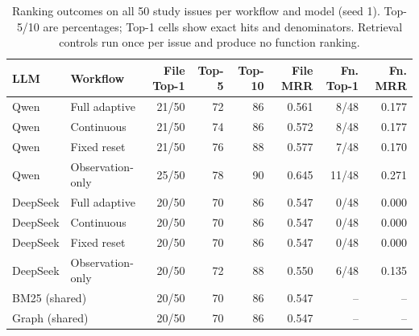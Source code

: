 \begin{table}[t]
\caption{Ranking outcomes on all 50 study issues per workflow and model (seed 1). Top-5/10 are percentages; Top-1 cells show exact hits and denominators. Retrieval controls run once per issue and produce no function ranking.}\label{tab:eval-ranking}
\centering\small
\begin{tabular*}{\textwidth}{@{\extracolsep{\fill}}llrrrrrr@{}}\toprule
LLM & Workflow & File Top-1 & Top-5 & Top-10 & File MRR & Fn. Top-1 & Fn. MRR\\\midrule
Qwen & Full adaptive & 21/50 & 72 & 86 & 0.561 & 8/48 & 0.177\\
Qwen & Continuous & 21/50 & 74 & 86 & 0.572 & 8/48 & 0.177\\
Qwen & Fixed reset & 21/50 & 76 & 88 & 0.577 & 7/48 & 0.170\\
Qwen & Observation-only & 25/50 & 78 & 90 & 0.645 & 11/48 & 0.271\\
\midrule
DeepSeek & Full adaptive & 20/50 & 70 & 86 & 0.547 & 0/48 & 0.000\\
DeepSeek & Continuous & 20/50 & 70 & 86 & 0.547 & 0/48 & 0.000\\
DeepSeek & Fixed reset & 20/50 & 70 & 86 & 0.547 & 0/48 & 0.000\\
DeepSeek & Observation-only & 20/50 & 72 & 88 & 0.550 & 6/48 & 0.135\\
\midrule
\multicolumn{2}{l}{BM25 (shared)} & 20/50 & 70 & 86 & 0.547 & -- & --\\
\multicolumn{2}{l}{Graph (shared)} & 20/50 & 70 & 86 & 0.547 & -- & --\\
\bottomrule\end{tabular*}
\end{table}
